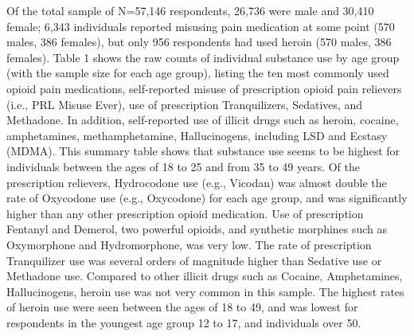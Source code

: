 \documentclass[sigconf]{acmart}
\begin{document}
Of the total sample of N=57,146 respondents, 26,736 were male and 30,410 
female; 6,343 individuals reported misusing pain medication at some point
(570 males, 386 females), but only 956 respondents had used heroin (570 males, 
386 females). Table 1 shows the raw counts of individual substance use by age 
group (with the sample size for each age group), listing the ten most commonly 
used opioid pain medications, self-reported misuse of prescription opioid pain 
relievers (i.e., PRL Misuse Ever), use of prescription Tranquilizers, Sedatives, 
and Methadone. In addition, self-reported use of illicit drugs such as heroin, 
cocaine, amphetamines, methamphetamine, Hallucinogens, including LSD and 
Ecstasy (MDMA). This summary table shows that substance use seems to be highest 
for individuals between the ages of 18 to 25 and from 35 to 49 years. Of the
prescription relievers, Hydrocodone use (e.g., Vicodan)  was almost double 
the rate of Oxycodone use (e.g., Oxycodone) for each age group, and was 
significantly higher than any other prescription opioid medication. Use of 
prescription Fentanyl and Demerol, two powerful opioids, and synthetic morphines 
such as Oxymorphone and Hydromorphone, was very low. The rate of prescription 
Tranquilizer use was several orders of magnitude higher than Sedative use or 
Methadone use. Compared to other illicit drugs such as Cocaine, Amphetamines, 
Hallucinogens, heroin use was not very common in this sample. The highest rates 
of heroin use were seen between the ages of 18 to 49, and was lowest for
respondents in the youngest age group 12 to 17, and individuals over 50. 
\end{document}
